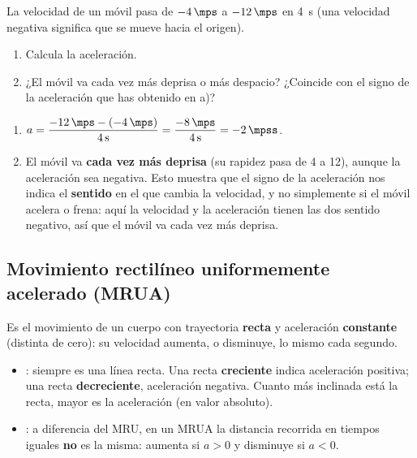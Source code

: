 \begin{exercise}
    La velocidad de un móvil pasa de \(\qty{-4}{\mps}\) a \(\qty{-12}{\mps}\) en \qty{4}{\s} (una velocidad negativa significa que se mueve hacia el origen).
    \begin{enumerate}[label=\letraminuscula]
        \item Calcula la aceleración.
        \item ¿El móvil va cada vez más deprisa o más despacio? ¿Coincide con el signo de la aceleración que has obtenido en a)?
    \end{enumerate}
    \begin{solu}
        \begin{enumerate}[label=\alph*)]
            \item \(a = \dfrac{\qty{-12}{\mps} - (\qty{-4}{\mps})}{\qty{4}{\s}} = \dfrac{\qty{-8}{\mps}}{\qty{4}{\s}} = \qty{-2}{\mpss}\).
            \item El móvil va \textbf{cada vez más deprisa} (su rapidez pasa de \qty{4}{\mps} a \qty{12}{\mps}), aunque la aceleración sea negativa. Esto muestra que el signo de la aceleración nos indica el \textbf{sentido} en el que cambia la velocidad, y no simplemente si el móvil acelera o frena: aquí la velocidad y la aceleración tienen las dos sentido negativo, así que el móvil va cada vez más deprisa.
        \end{enumerate}
    \end{solu}
\end{exercise}

\subsection{Movimiento rectilíneo uniformemente acelerado (MRUA)}

\begin{definition}[MRUA]
    Es el movimiento de un cuerpo con trayectoria \textbf{recta} y aceleración \textbf{constante} (distinta de cero): su velocidad aumenta, o disminuye, lo mismo cada segundo.
\end{definition}

\begin{itemize}
    \item {}: siempre es una línea recta. Una recta \textbf{creciente} indica aceleración positiva; una recta \textbf{decreciente}, aceleración negativa. Cuanto más inclinada está la recta, mayor es la aceleración (en valor absoluto).
    \item {}: a diferencia del MRU, en un MRUA la distancia recorrida en tiempos iguales \textbf{no} es la misma: aumenta si \(a>0\) y disminuye si \(a<0\).
\end{itemize}

